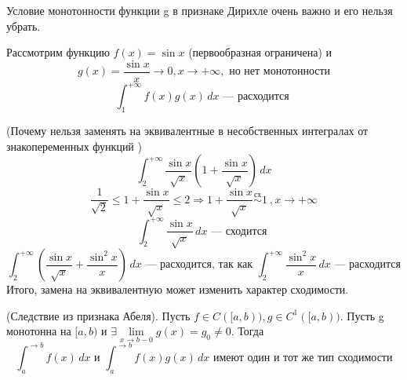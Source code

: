 \documentclass[11pt]{article}
\begin{document}
\begin{remark}
    Условие монотонности функции g в признаке Дирихле очень важно и его нельзя убрать.
\end{remark}

\begin{example}
    Рассмотрим функцию $f(x) = \sin x$ (первообразная ограничена) и \\  
    \[ g(x) = \frac{\sin x}{x}\to 0, x\to +\infty ,\text{ но нет монотонности} \] 
    \[ \int_{1}^{+\infty } f(x)g(x)\, dx \text{ --- расходится } \]
\end{example}

\begin{example}
    (Почему нельзя заменять на эквивалентные в несобственных интегралах от знакопеременных функций ) 
    \[ \int_{2}^{+\infty} \frac{\sin x}{\sqrt{x}} (1+ \frac{\sin x}{\sqrt{x}} )\, dx \]
    \[ \frac{1}{\sqrt{2}} \le 1+ \frac{\sin x}{\sqrt{x}} \le 2 \Rightarrow 1+\frac{\sin x}{\sqrt{x}} \overset{\text{сх}}{\sim} 1 \ ,x\to +\infty \]
    \[ \int_{2}^{+\infty} \frac{\sin x}{\sqrt{x}}\, dx \text{ --- сходится } \]
    \[ \int_{2}^{+\infty} \left(\frac{\sin x}{\sqrt{x}} + \frac{\sin^2 x}{x}\right) \, dx \text{ --- расходится, так как } \int_{2}^{+\infty} \frac{\sin^2 x}{x}\, dx \text{ --- расходится} \]
    Итого, замена на эквивалентную может изменить характер сходимости. 
\end{example}

\begin{theorem}
    (Следствие из признака Абеля). Пусть $f\in C([a,b)), g\in C^1([a,b)) $. Пусть g монотонна на $[a,b)$ и $\exists \lim\limits_{x\to b-0} g(x) = g_0 \neq 0$.
    Тогда 
    \[ \int_{a}^{\to b} f(x)\, dx \text{ и } \int_{a}^{\to b} f(x)g(x)\, dx \text{ имеют один и тот же тип сходимости} \]
\end{theorem}
\end{document}
